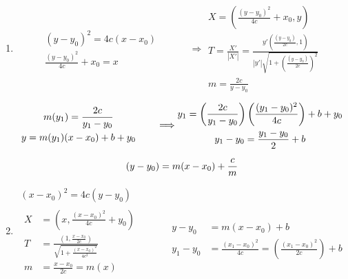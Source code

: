 \documentclass[twoside]{amsart}
\theoremstyle{plain}
\theoremstyle{definition}
\newcommand{\exercisehead}[1]
  {\smallskip
   \noindent{\small\bf Exercise #1.}}
\begin{document}
\exercisehead{4}
\begin{enumerate}
\item 
\[
\begin{gathered}
  \begin{gathered}
    (y-y_0)^2 = 4c(x-x_0) \\
    \frac{ (y-y_0)^2}{4c} + x_0 = x 
  \end{gathered} \quad \quad \quad \Longrightarrow \begin{gathered}
    X = \left( \frac{ (y-y_0)^2}{4c} + x_0, y \right)  \\
    T = \frac{X'}{|X'|} = \frac{ y' \left( \frac{(y-y_0) }{2c} ,1 \right) }{ |y'| \sqrt{ 1 + \left( \frac{(y-y_0)}{2c} \right)^2 } } \\
    m = \frac{2c}{y-y_0}
\end{gathered} 
\end{gathered}
\]
\[
\begin{gathered}
  \begin{gathered}
    m(y_1) = \frac{2c}{ y_1 - y_0 } \\
    y = m(y_1) (x-x_0) + b+ y_0 
  \end{gathered} \quad \quad \, \Longrightarrow 
  \begin{gathered}
    y_1 = \left( \frac{2c}{ y_1 - y_0 } \right)\left( \frac{(y_1 -y_0)^2}{4c} \right) + b + y_0 \\
    y_1 - y_0 = \frac{y_1 -y_0 }{2} + b 
  \end{gathered}  \medskip \\
  (y-y_0) = m(x-x_0) + \frac{c}{m}
\end{gathered}
\] 
\item 
\[
\begin{gathered}
  (x-x_0)^2 = 4c(y-y_0) \\
  \begin{aligned}
    X & = (x,\frac{ (x-x_0)^2}{4c} + y_0) \\
    T & = \frac{ \left( 1 , \frac{x-x_0}{2c} \right) }{ \sqrt{ 1 + \frac{ (x-x_0)^2}{4c^2} } } \\
    m & = \frac{x-x_0}{2c} = m(x) 
  \end{aligned} 
  \quad \quad \quad 
  \begin{aligned}
    y - y_0 & = m(x-x_0) + b \\
    y_1 - y_0 & = \frac{ (x_1- x_0)^2}{4c} = \left( \frac{(x_1-x_0)^2}{2c} \right) + b 
  \end{aligned}  
\end{gathered}
\]
\[
\begin{gathered}

\end{gathered}\]
\end{enumerate}
\end{document}
